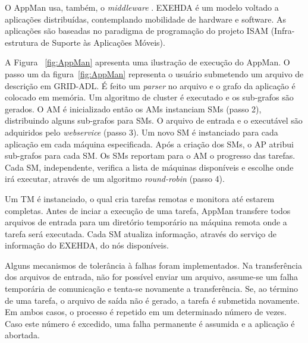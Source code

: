 O AppMan usa, também, o \emph{middleware} \cite{exehda}. EXEHDA é um modelo voltado a aplicações distribuídas, contemplando mobilidade de hardware e software. As aplicações são baseadas no paradigma de programação do projeto ISAM (Infra-estrutura de Suporte às Aplicações Móveis).

A Figura ~\ref{fig:AppMan}  apresenta uma ilustração de execução do AppMan. O passo um da figura~\ref{fig:AppMan} representa o usuário submetendo um arquivo de descrição em GRID-ADL. É feito um \emph{parser} no arquivo e o grafo da aplicação é colocado em memória. Um algoritmo de cluster é executado e os sub-grafos são gerados. O AM é inicializado então os AMs instanciam SMs (passo 2), distribuindo alguns sub-grafos para SMs. O arquivo de entrada e o executável são adquiridos pelo \emph{webservice} (passo 3). Um novo SM é instanciado para cada aplicação em cada máquina especificada. Após a criação dos SMs, o AP atribui sub-grafos para cada SM. Os SMs reportam para o AM o progresso das tarefas. Cada SM, independente, verifica a lista de máquinas disponíveis e escolhe onde irá executar, através de um algoritmo \emph{round-robin} (passo 4).

Um TM é instanciado, o qual cria tarefas remotas e monitora até estarem completas. Antes de inciar a execução de uma tarefa, AppMan transfere todos arquivos de entrada para um diretório temporário na máquina remota onde a tarefa será executada. Cada SM atualiza informação, através do serviço de informação do EXEHDA, do nós disponíveis. 

Alguns mecanismos de tolerância à falhas foram implementados. Na transferência dos arquivos de entrada, não for possível enviar um arquivo, assume-se um falha temporária de comunicação e tenta-se novamente a transferência. Se, ao término de uma tarefa, o arquivo de saída não é gerado, a tarefa é submetida novamente. Em ambos casos, o processo é repetido em um determinado número de vezes. Caso este número é excedido, uma falha permanente é assumida e a aplicação é abortada.

